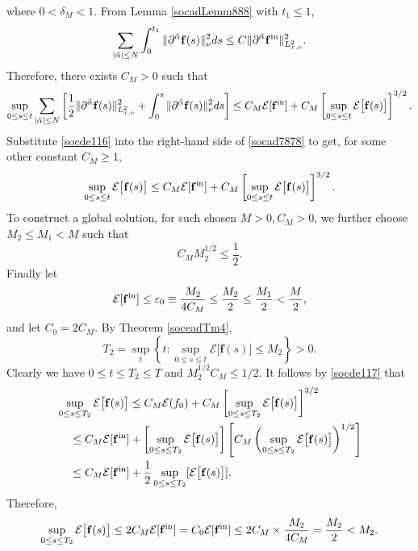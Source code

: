 \documentclass[reqno]{amsart}
\numberwithin{equation}{section}
\numberwithin{equation}{section}
\begin{document}
		where $ 0 < \delta_M < 1 $. From Lemma \ref{socadLemm888} with $ t_1 \leq 1 $,
		$$
		\sum_{|\tilde{\alpha}| \leq N} \int_{0}^{t_1} \|\partial^{\tilde{\alpha}} \mathbf{f}(s)\|_{\nu}^2 ds \leq C\|\partial^{\tilde{\alpha}} \mathbf{f}^{\rm{in}}\|^2_{L^{2}_{x,v}}.
		$$
		Therefore, there exists $ C_M > 0 $ such that
		\begin{equation}\label{socde116}
		\sup_{0 \leq s \leq t} \sum_{|\tilde{\alpha}| \leq N} \left[ \frac{1}{2} \|\partial^{\tilde{\alpha}} \mathbf{f}(s)\|^2_{L^{2}_{x,v}} + \int_0^s \|\partial^{\tilde{\alpha}} \mathbf{f}(s)\|^2_{\nu} ds \right]
		\le C_M \mathcal{E}[\mathbf{f}^{\rm{in}}] + C_M \left[ \sup_{0 \leq s \le t} \mathcal{E}\big[\mathbf{f}(s)\big] \right]^{3/2}.
		\end{equation}
		Substitute  \eqref{socde116} into the right-hand side of \eqref{socad7878} to get, for some other constant $ C_M \ge 1 $,
		\begin{equation}\label{socde117}
		\sup_{0 \le s \leq t} \mathcal{E}\big[\mathbf{f}(s)\big] \le C_M \mathcal{E}[\mathbf{f}^{\rm{in}}]  + C_M \left[ \sup_{0 \leq s \le t} \mathcal{E}\big[\mathbf{f}(s)\big] \right]^{3/2}.
		\end{equation}
		To construct a global solution, for such chosen $ M > 0, C_M > 0 $, we further choose $ M_2 \le M_1 < M $ such that
		$$
		C_M M_2^{1/2} \leq \frac{1}{2}.
		$$
		Finally let
		$$
		\mathcal{E}[\mathbf{f}^{\rm{in}}] \le \varepsilon_0 \equiv \frac{M_2}{4C_M} \leq \frac{M_2}{2} \leq \frac{M_1}{2} < \frac{M}{2},
		$$
		and let $ C_0 = 2C_M $. By Theorem \ref{soceadTm4},
		$$
		T_2 = \sup_t \left\{ t : \sup_{0 \le s \le t} \mathcal{E}\big[\mathbf{f}(s)\big] \le M_2 \right\} > 0.
		$$
		 Clearly we have $ 0 \le t \le T_2 \le T $ and $ M_2^{1/2} C_M \le 1/2 $. It follows by \eqref{socde117} that
		\begin{align*}
		&\sup_{0 \le s \le T_2} \mathcal{E}\big[\mathbf{f}(s)\big] \leq C_M \mathcal{E}(f_0) + C_M \left[ \sup_{0 \leq s \leq T_2} \mathcal{E}\big[\mathbf{f}(s)\big] \right]^{3/2}\\
		&\hspace{0.4cm}\leq C_M \mathcal{E}[\mathbf{f}^{\rm{in}}] + \left[ \sup_{0 \le s \le T_2} \mathcal{E}\big[\mathbf{f}(s)\big] \right] \left[ C_M \left( \sup_{0 \leq s \leq T_2} \mathcal{E}\big[\mathbf{f}(s)\big] \right)^{1/2} \right]\\
		&\hspace{0.4cm}\leq C_M \mathcal{E}[\mathbf{f}^{\rm{in}}] + \frac{1}{2} \sup_{0 \leq s \le T_2} [\mathcal{E}\big[\mathbf{f}(s)\big]].
		\end{align*}
	Therefore,
		\begin{equation}\label{socdlaste}
		\sup_{0 \leq s \le T_2} \mathcal{E}\big[\mathbf{f}(s)\big] \le 2 C_M \mathcal{E}[\mathbf{f}^{\rm{in}}] = C_0 \mathcal{E}[\mathbf{f}^{\rm{in}}] \le 2 C_M \times \frac{M_2}{4 C_M} =  \frac{M_2}{2} < M_2.
		\end{equation}
		
\end{document}
